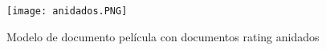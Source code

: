 \documentclass[conference,compsoc]{sty/IEEEtran}
\begin{document}
\begin{figure}
\begin{center}
\texttt{[image: anidados.PNG]}
\end{center}
\caption{Modelo de documento película con documentos rating anidados} 
\label{fig:documento-anidado}
\end{figure}




\end{document}

